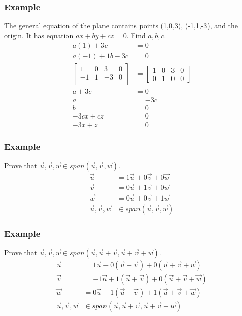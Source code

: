 \documentclass[letterpaper, 12pt]{math}
\begin{document}
\subsubsection*{Example}
The general equation of the plane contains points (1,0,3), (-1,1,-3), and the
origin. It has equation \( ax+by+cz = 0 \). Find \( a,b,c \).
\begin{align*}
  a(1)+3c &= 0 \\
  a(-1)+1b-3c &= 0 \\
  \left[\begin{array}{ccc|c}
    1 & 0 & 3 & 0 \\
    -1 & 1 & -3 & 0 \\
  \end{array}\right] &= \left[\begin{array}{ccc|c}
    1 & 0 & 3 & 0 \\
    0 & 1 & 0 & 0
  \end{array}\right] \\
  a+3c &= 0 \\
  a &= -3c \\
  b &= 0 \\
  -3cx+cz &= 0 \\
  -3x+z &= 0
\end{align*}

\subsubsection*{Example}
Prove that \( \vec{u},\vec{v},\vec{w}\in span(\vec{u},\vec{v},\vec{w}) \).
\begin{align*}
  \vec{u} &= 1\vec{u}+0\vec{v}+0\vec{w} \\
  \vec{v} &= 0\vec{u}+1\vec{v}+0\vec{w} \\
  \vec{w} &= 0\vec{u}+0\vec{v}+1\vec{w} \\
  \vec{u},\vec{v},\vec{w} &\in span(\vec{u},\vec{v},\vec{w})
\end{align*}

\subsubsection*{Example}
Prove that \( \vec{u},\vec{v},\vec{w}\in span(\vec{u},\vec{u}+\vec{v},\vec{u}+
\vec{v}+\vec{w}) \).
\begin{align*}
  \vec{u} &= 1\vec{u}+0(\vec{u}+\vec{v})+0(\vec{u}+\vec{v}+\vec{w}) \\
  \vec{v} &= -1\vec{u}+1(\vec{u}+\vec{v})+0(\vec{u}+\vec{v}+\vec{w}) \\
  \vec{w} &= 0\vec{u}-1(\vec{u}+\vec{v})+1(\vec{u}+\vec{v}+\vec{w}) \\
  \vec{u},\vec{v},\vec{w} &\in
    span(\vec{u},\vec{u}+\vec{v},\vec{u}+\vec{v}+\vec{w})
\end{align*}
\end{document}
